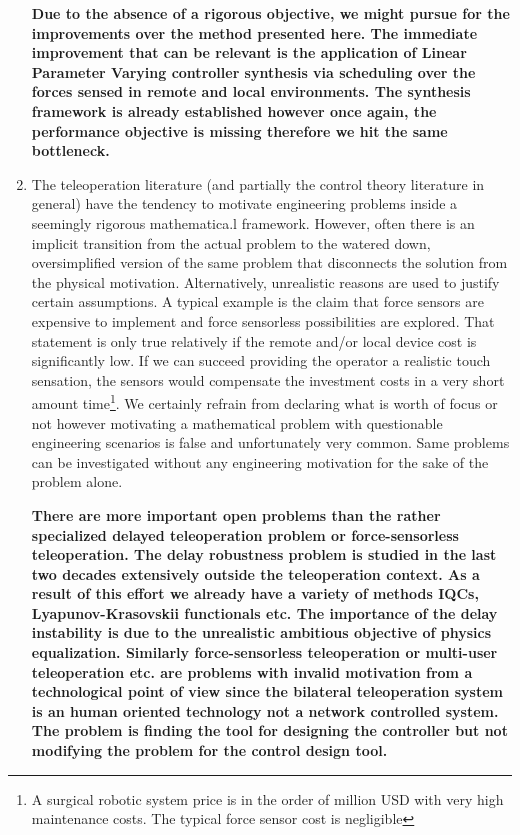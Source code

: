 \begin{enumerate}
    {\bfseries Due to the absence of a rigorous objective, we might pursue for the improvements over the method presented here. The 
    immediate improvement that can be relevant is the application of Linear Parameter Varying controller synthesis via scheduling over the 
    forces sensed in remote and local environments. The synthesis framework is already established however once again, the performance 
    objective is missing therefore we hit the same bottleneck. 
    }
    \item The teleoperation literature (and partially the control theory literature in general) have the tendency to motivate engineering 
    problems inside a seemingly rigorous mathematica.l framework. However, often there is an implicit transition from the actual problem to 
    the watered down, oversimplified version of the same problem that disconnects the solution from the physical motivation. Alternatively, unrealistic 
    reasons are used to justify certain assumptions. A typical example is the claim that force sensors are expensive to implement and 
    force sensorless possibilities are explored. That statement is only true relatively if the remote and/or local device cost is significantly
    low. If we can succeed providing the operator a realistic touch sensation, the sensors would compensate the
    investment costs in a very short amount time\footnote{A surgical robotic system price is in the order of million USD with very high maintenance 
    costs. The typical force sensor cost is negligible}. We certainly refrain from declaring what is worth of focus or not however motivating 
    a mathematical problem with questionable engineering scenarios is false and unfortunately very common. Same problems can be investigated 
    without any engineering motivation for the sake of the problem alone.
    
    {\bfseries There are more important open problems than the rather specialized delayed teleoperation problem or force-sensorless teleoperation.
    The delay robustness problem is studied in the last two decades extensively outside the teleoperation context. As a result of this 
    effort we already have a variety of methods IQCs, Lyapunov-Krasovskii functionals etc. The importance of the delay instability is due 
    to the unrealistic ambitious objective of physics equalization. Similarly force-sensorless teleoperation or multi-user teleoperation etc.
    are problems with invalid motivation from a technological point of view since the bilateral teleoperation system is an human oriented
    technology not a network controlled system. The problem is finding the tool for designing the controller but not modifying the problem 
    for the control design tool.
    }
    
\end{enumerate}


